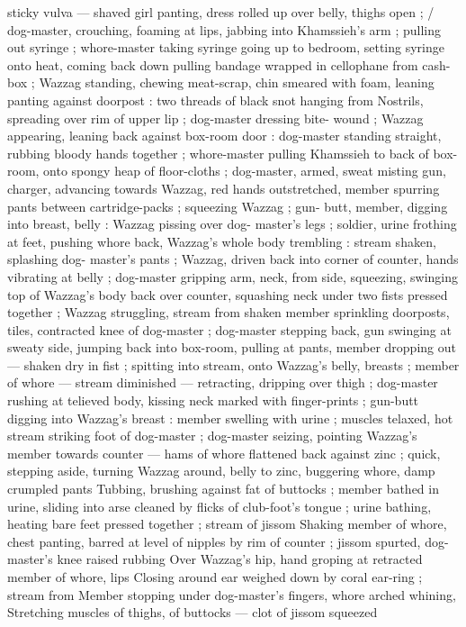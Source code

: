 sticky vulva --- shaved girl panting, dress rolled up over belly, thighs 
open ; {\slash} dog-master, crouching, foaming at lips, jabbing into 
Khamssieh's arm ; pulling out syringe ; whore-master taking syringe 
going up to bedroom, setting syringe onto heat, coming back down 
pulling bandage wrapped in cellophane from cash-box ; Wazzag 
standing, chewing meat-scrap, chin smeared with foam, leaning 
panting against doorpost : two threads of black snot hanging from 
Nostrils, spreading over rim of upper lip ; dog-master dressing bite- 
wound ; Wazzag appearing, leaning back against box-room door : 
dog-master standing straight, rubbing bloody hands together ; 
whore-master pulling Khamssieh to back of box-room, onto spongy 
heap of floor-cloths ; dog-master, armed, sweat misting gun, charger, 
advancing towards Wazzag, red hands outstretched, member 
spurring pants between cartridge-packs ; squeezing Wazzag ; gun- 
butt, member, digging into breast, belly : Wazzag pissing over dog- 
master's legs ; soldier, urine frothing at feet, pushing whore back, 
Wazzag's whole body trembling : stream shaken, splashing dog- 
master's pants ; Wazzag, driven back into corner of counter, hands 
vibrating at belly ; dog-master gripping arm, neck, from side, 
squeezing, swinging top of Wazzag's body back over counter, 
squashing neck under two fists pressed together ; Wazzag 
struggling, stream from shaken member sprinkling doorposts, tiles, 
contracted knee of dog-master ; dog-master stepping back, gun 
swinging at sweaty side, jumping back into box-room, pulling at 
pants, member dropping out --- shaken dry in fist ; spitting into 
stream, onto Wazzag's belly, breasts ; member of whore --- stream 
diminished --- retracting, dripping over thigh ; dog-master rushing at 
telieved body, kissing neck marked with finger-prints ; gun-butt 
digging into Wazzag's breast : member swelling with urine ; muscles 
telaxed, hot stream striking foot of dog-master ; dog-master seizing, 
pointing Wazzag's member towards counter --- hams of whore 
flattened back against zinc ; quick, stepping aside, turning Wazzag 
around, belly to zinc, buggering whore, damp crumpled pants 
Tubbing, brushing against fat of buttocks ; member bathed in urine, 
sliding into arse cleaned by flicks of club-foot's tongue ; urine 
bathing, heating bare feet pressed together ; stream of jissom 
Shaking member of whore, chest panting, barred at level of nipples 
by rim of counter ; jissom spurted, dog-master's knee raised rubbing 
Over Wazzag's hip, hand groping at retracted member of whore, lips 
Closing around ear weighed down by coral ear-ring ; stream from 
Member stopping under dog-master's fingers, whore arched whining, 
Stretching muscles of thighs, of buttocks --- clot of jissom squeezed 
